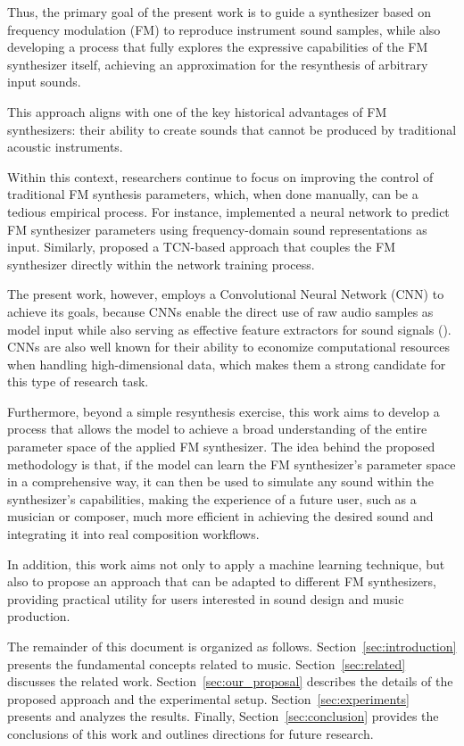 Thus, the primary goal of the present work is to guide a synthesizer based on frequency modulation (FM) to reproduce instrument sound samples, while also developing a process that fully explores the expressive capabilities of the FM synthesizer itself, achieving an approximation for the resynthesis of arbitrary input sounds.

This approach aligns with one of the key historical advantages of FM synthesizers: their ability to create sounds that cannot be produced by traditional acoustic instruments.

Within this context, researchers continue to focus on improving the control of traditional FM synthesis parameters, which, when done manually, can be a tedious empirical process. For instance, \textcite{claesson2021resynthesis} implemented a neural network to predict FM synthesizer parameters using frequency-domain sound representations as input. Similarly, \textcite{steinmetz2022ddx7} proposed a TCN-based approach that couples the FM synthesizer directly within the network training process.

The present work, however, employs a Convolutional Neural Network (CNN) to achieve its goals, because CNNs enable the direct use of raw audio samples as model input while also serving as effective feature extractors for sound signals (\textcite{kiranyaz2021survey}). CNNs are also well known for their ability to economize computational resources when handling high-dimensional data, which makes them a strong candidate for this type of research task.

Furthermore, beyond a simple resynthesis exercise, this work aims to develop a process that allows the model to achieve a broad understanding of the entire parameter space of the applied FM synthesizer. The idea behind the proposed methodology is that, if the model can learn the FM synthesizer’s parameter space in a comprehensive way, it can then be used to simulate any sound within the synthesizer’s capabilities, making the experience of a future user, such as a musician or composer, much more efficient in achieving the desired sound and integrating it into real composition workflows.

In addition, this work aims not only to apply a machine learning technique, but also to propose an approach that can be adapted to different FM synthesizers, providing practical utility for users interested in sound design and music production.

The remainder of this document is organized as follows. Section~\ref{sec:introduction} presents the fundamental concepts related to music. Section~\ref{sec:related} discusses the related work. Section~\ref{sec:our_proposal} describes the details of the proposed approach and the experimental setup. Section~\ref{sec:experiments} presents and analyzes the results. Finally, Section~\ref{sec:conclusion} provides the conclusions of this work and outlines directions for future research.
